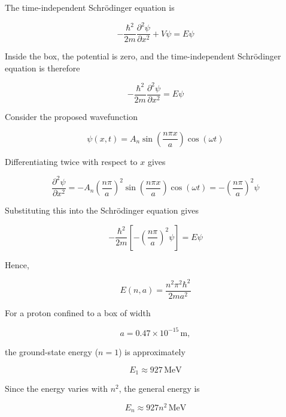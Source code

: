\documentclass{article}
\begin{document}
The time-independent Schrödinger equation is

\begin{equation*}
-\frac{\hbar^2}{2m} \frac{\partial^2\psi}{\partial x^2} + V\psi = E\psi
\end{equation*}

Inside the box, the potential is zero, and the time-independent Schrödinger equation is therefore

\begin{equation*}
-\frac{\hbar^2}{2m} \frac{\partial^2\psi}{\partial x^2} = E\psi
\end{equation*}

Consider the proposed wavefunction

\begin{equation*}
\psi(x,t) = A_n\sin\left(\frac{n\pi x}{a}\right)\cos(\omega t)
\end{equation*}

Differentiating twice with respect to $x$ gives

\begin{equation*}
\frac{\partial^2\psi}{\partial x^2} = -A_n \left(\frac{n\pi}{a}\right)^2 \sin\left(\frac{n\pi x}{a}\right) \cos(\omega t)
= -\left(\frac{n\pi}{a}\right)^2\psi
\end{equation*}

Substituting this into the Schrödinger equation gives

\begin{equation*}
-\frac{\hbar^2}{2m} \left[-\left(\frac{n\pi}{a}\right)^2\psi\right] = E\psi
\end{equation*}

Hence,

\begin{equation*}
\boxed{E(n,a) = \frac{n^2\pi^2\hbar^2}{2ma^2}}
\end{equation*}

For a proton confined to a box of width

\begin{equation*}
a = 0.47\times10^{-15}\,\mathrm{m},
\end{equation*}

the ground-state energy ($n=1$) is approximately

\begin{equation*}
E_1\approx927\,\mathrm{MeV}
\end{equation*}

Since the energy varies with $n^2$, the general energy is

\begin{equation*}
\boxed{E_n\approx927n^2\,\mathrm{MeV}}
\end{equation*}
\end{document}
